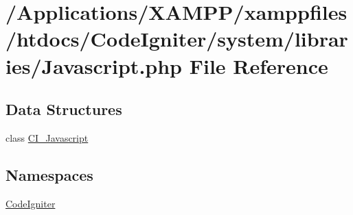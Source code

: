\hypertarget{_javascript_8php}{}\section{/\+Applications/\+X\+A\+M\+P\+P/xamppfiles/htdocs/\+Code\+Igniter/system/libraries/\+Javascript.php File Reference}
\label{_javascript_8php}
\subsection*{Data Structures}
\begin{DoxyCompactItemize}
\item 
class \mbox{\hyperlink{class_c_i___javascript}{C\+I\+\_\+\+Javascript}}
\end{DoxyCompactItemize}
\subsection*{Namespaces}
\begin{DoxyCompactItemize}
\item 
 \mbox{\hyperlink{namespace_code_igniter}{Code\+Igniter}}
\end{DoxyCompactItemize}

